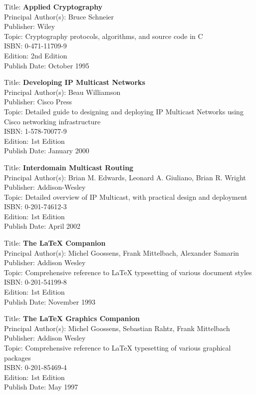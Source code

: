 Title: 	\textbf{Applied Cryptography}	\\
Principal Author(s): 	Bruce Schneier  \\
Publisher:	Wiley	\\	
Topic:		Cryptography protocols, algorithms, and source code in C \\
ISBN:			0-471-11709-9 \\
Edition:		2nd Edition \\
Publish Date:		October 1995


Title: 	\textbf{Developing IP Multicast Networks}	\\
Principal Author(s): 	Beau Williamson  \\
Publisher:	Cisco Press	\\	
Topic:		Detailed guide to designing and deploying IP Multicast Networks using Cisco networking infrastructure \\
ISBN:			1-578-70077-9 \\
Edition:		1st Edition \\
Publish Date:		January 2000


Title: 	\textbf{Interdomain Multicast Routing}	\\
Principal Author(s): 	Brian M. Edwards, Leonard A. Giuliano, Brian R. Wright\\
Publisher:	Addison-Wesley	\\	
Topic:		Detailed overview of IP Multicast, with practical design and deployment \\
ISBN:			0-201-74612-3 \\
Edition:		1st Edition \\
Publish Date:		April 2002


Title: 	\textbf{The \textrm{\LaTeX{}}  Companion}	\\
Principal Author(s): 	Michel Goossens, Frank Mittelbach, Alexander Samarin  \\
Publisher:	Addison Wesley	\\	
Topic:		Comprehensive reference to \textrm{\LaTeX{}} typesetting of various document styles \\
ISBN:			0-201-54199-8 \\
Edition:		1st Edition \\
Publish Date:		November 1993


Title: 	\textbf{The \textrm{\LaTeX{}} Graphics Companion}	\\
Principal Author(s): 	Michel Goossens, Sebastian Rahtz, Frank Mittelbach  \\
Publisher:	Addison Wesley	\\	
Topic:		Comprehensive reference to \textrm{\LaTeX{}} typesetting of various graphical packages \\
ISBN:			0-201-85469-4 \\
Edition:		1st Edition \\
Publish Date:		May 1997

